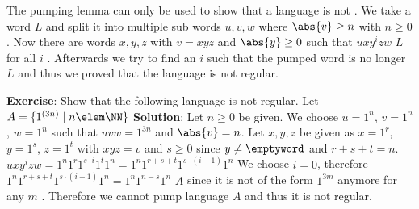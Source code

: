     The pumping lemma can only be used to show that a language is not \REG. We take a word \word \elem $L$ and split it into multiple sub words $u,v,w$
    where $\abs{v}\geq n$ with $n \ge 0$. Now there are words $x,y,z$ with $v=xyz$ and $\abs{y} \ge 0$ such that $uxy^izw$ \elem $L$ for all
    $i$ \elem \NN. Afterwards we try to find an $i$ such that the pumped word is no longer \elem $L$ and thus we proved that the language is not regular.

    \textbf{Exercise}:\newline
    Show that the following language is not regular.\newline
    Let $A=\{ 1^{(3n)} \mid n \elem \NN \}$\newline\newline
    \textbf{Solution}:\newline
    Let $n \geq 0$ be given.\newline
    We choose $u=1^n$, $v=1^n$, $w=1^n$ such that $uvw=1^{3n}$ and $\abs{v}=n$.\newline
    Let $x,y,z$ be given as $x=1^r$, $y=1^s$, $z=1^t$ with $xyz=v$ and $s \ge 0$ since $y \neq \emptyword$ and $r+s+t=n$.\newline
    $uxy^izw=1^n 1^r 1^{s \cdot i} 1^t 1^n=1^n 1^{r+s+t} 1^{s \cdot (i-1)} 1^n$\newline
    We choose $i=0$, therefore $1^n 1^{r+s+t} 1^{s \cdot (i-1)} 1^n = 1^n 1^{n-s} 1^n$ \notelem $A$ since it is not of the form $1^{3m}$ anymore for any $m$ \elem \NN.\newline
    Therefore we cannot pump language $A$ and thus it is not regular.\newline


    \newpage


